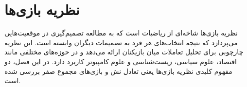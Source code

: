 \section
{
 نظریه بازی‌‌ها
}\label{sec:marl_games}
نظریه بازی‌ها شاخه‌ای از ریاضیات است که به مطالعه تصمیم‌گیری در موقعیت‌هایی می‌پردازد که نتیجه انتخاب‌های هر فرد به تصمیمات دیگران وابسته است. این نظریه چارچوبی برای تحلیل تعاملات میان بازیکنان ارائه می‌دهد و در حوزه‌های مختلفی مانند اقتصاد، علوم سیاسی، زیست‌شناسی و علوم کامپیوتر کاربرد دارد. در این فصل، دو مفهوم کلیدی نظریه بازی‌ها یعنی تعادل نش و بازی‌های مجموع صفر بررسی شده‌ است.